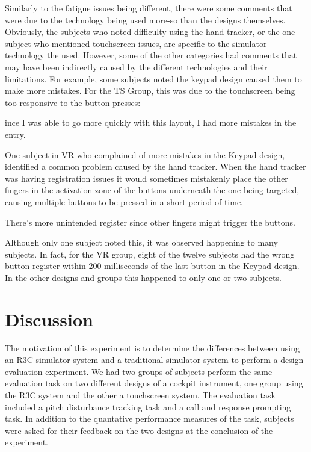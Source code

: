 Similarly to the fatigue issues being different, there were some comments that were due to the technology being used more-so than the designs themselves.
Obviously, the subjects who noted difficulty using the hand tracker, or the one subject who mentioned touchscreen issues, are specific to the simulator technology the used.
However, some of the other categories had comments that may have been indirectly caused by the different technologies and their limitations.
For example, some subjects noted the keypad design caused them to make more mistakes.
For the TS Group, this was due to the touchscreen being too responsive to the button presses:
\begin{displayquote}[TS Subject]
    ince I was able to go more quickly with this layout, I had more mistakes in the entry.
\end{displayquote}
One subject in VR who complained of more mistakes in the Keypad design, identified a common problem caused by the hand tracker.
When the hand tracker was having registration issues it would sometimes mistakenly place the other fingers in the activation zone of the buttons underneath the one being targeted, causing multiple buttons to be pressed in a short period of time.
\begin{displayquote}[VR Subject]
    There's more unintended register since other fingers might trigger the buttons.
\end{displayquote}
Although only one subject noted this, it was observed happening to many subjects.
In fact, for the VR group, eight of the twelve subjects had the wrong button register within 200 milliseconds of the last button in the Keypad design.
In the other designs and groups this happened to only one or two subjects.


\section{Discussion}

The motivation of this experiment is to determine the differences between using an R3C simulator system and a traditional simulator system to perform a design evaluation experiment.
We had two groups of subjects perform the same evaluation task on two different designs of a cockpit instrument, one group using the R3C system and the other a touchscreen system.
The evaluation task included a pitch disturbance tracking task and a call and response prompting task.
In addition to the quantative performance measures of the task, subjects were asked for their feedback on the two designs at the conclusion of the experiment.

